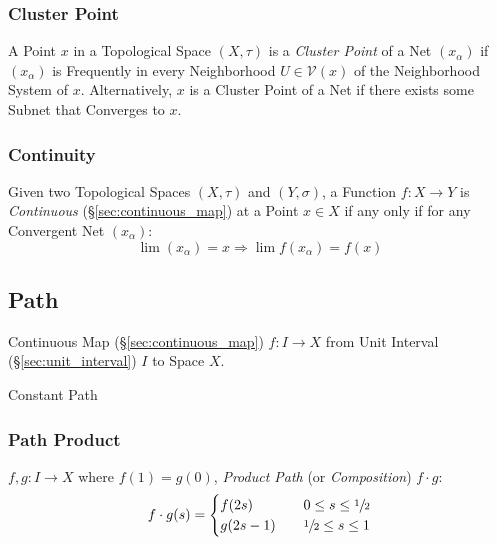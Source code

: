 \subsubsection{Cluster Point}\label{sec:cluster_point}

A Point $x$ in a Topological Space $(X,\tau)$ is a \emph{Cluster
  Point} of a Net $(x_\alpha)$ if $(x_\alpha)$ is Frequently in every
Neighborhood $U \in \mathcal{V}(x)$ of the Neighborhood System of $x$.
Alternatively, $x$ is a Cluster Point of a Net if there exists some
Subnet that Converges to $x$.



\subsubsection{Continuity}\label{sec:net_continuity}

Given two Topological Spaces $(X,\tau)$ and $(Y,\sigma)$, a Function
$f : X \rightarrow Y$ is \emph{Continuous}
(\S\ref{sec:continuous_map}) at a Point $x \in X$ if any only if for
any Convergent Net $(x_\alpha)$:
\[
  \lim (x_\alpha) = x \Rightarrow \lim f(x_\alpha) = f(x)
\]



\subsection{Path}\label{sec:path} \cite{hatcher02}

Continuous Map (\S\ref{sec:continuous_map}) $f : I \rightarrow X$ from
Unit Interval (\S\ref{sec:unit_interval}) $I$ to Space $X$.

Constant Path %



\subsubsection{Path Product}\label{sec:path_product}

$f,g : I \rightarrow X$ where $f(1) = g(0)$, \emph{Product Path} (or
\emph{Composition}) $f \cdot g$:
\[
  f \cdot g (s) =
  \begin{cases}
    f(2s)   & \quad 0 \leq s \leq \sfrac{1}{2} \\
    g(2s-1) & \quad \sfrac{1}{2} \leq s \leq 1 \\
  \end{cases}
\]




